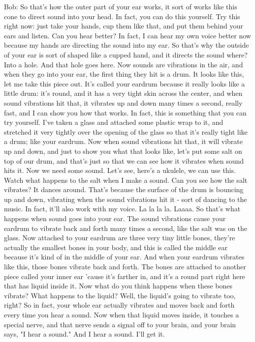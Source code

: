 Bob: So that's how the outer part of your ear works, it sort of works like this cone to direct sound into your head. In fact, you can do this yourself. Try this right now: just take your hands, cup them like that, and put them behind your ears and listen. Can you hear better? In fact, I can hear my own voice better now because my hands are directing the sound into my ear. So that's why the outside of your ear is sort of shaped like a cupped hand, and it directs the sound where? Into a hole. And that hole goes here. Now sounds are vibrations in the air, and when they go into your ear, the first thing they hit is a drum. It looks like this, let me take this piece out. It's called your eardrum because it really looks like a little drum: it's round, and it has a very tight skin across the center, and when sound vibrations hit that, it vibrates up and down many times a second, really fast, and I can show you how that works. In fact, this is something that you can try yourself. I've taken a glass and attached some plastic wrap to it, and stretched it very tightly over the opening of the glass so that it's really tight like a drum; like your eardrum. Now when sound vibrations hit that, it will vibrate up and down, and just to show you what that looks like, let's put some salt on top of our drum, and that's just so that we can see how it vibrates when sound hits it. Now we need some sound. Let's see, here's a ukulele, we can use this. Watch what happens to the salt when I make a sound. Can you see how the salt vibrates? It dances around. That's because the surface of the drum is bouncing up and down, vibrating when the sound vibrations hit it - sort of dancing to the music. In fact, it'll also work with my voice. La la la la. Laaaa. So that's what happens when sound goes into your ear. The sound vibrations cause your eardrum to vibrate back and forth many times a second, like the salt was on the glass. Now attached to your eardrum are three very tiny little bones, they're actually the smallest bones in your body, and this is called the middle ear because it's kind of in the middle of your ear. And when your eardrum vibrates like this, those bones vibrate back and forth. The bones are attached to another piece called your inner ear 'cause it's farther in, and it's a round part right here that has liquid inside it. Now what do you think happens when these bones vibrate? What happens to the liquid? Well, the liquid's going to vibrate too, right? So in fact, your whole ear actually vibrates and moves back and forth every time you hear a sound. Now when that liquid moves inside, it touches a special nerve, and that nerve sends a signal off to your brain, and your brain says, "I hear a sound." And I hear a sound. I'll get it.

